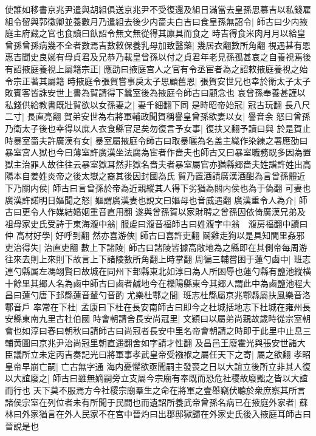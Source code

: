 使誰如移書京兆尹遣與胡組俱送京兆尹不受復還及組日滿當去皇孫思慕吉以私錢雇組令留與郭徵卿並養數月乃遣組去後少内嗇夫白吉曰食皇孫無詔令|{
	師古曰少内掖庭主府藏之官也食讀曰飤詔令無文無從得其廪具而食之}
時吉得食米肉月月以給皇曾孫曾孫病幾不全者數焉吉數敕保養乳母加致醫藥|{
	幾居衣翻數所角翻}
視遇甚有恩惠吉聞史良娣有母貞君及兄恭乃載皇曾孫以付之貞君年老見孫孤甚哀之自養視焉後有詔掖庭養視上屬籍宗正|{
	應劭曰掖庭宫人之官有令丞宦者為之詔敕掖庭養視之始令宗正著其屬籍}
時掖庭令張賀嘗事戾太子思顧舊恩|{
	張賀安世兄也幸於衛太子太子敗賓客皆誅安世上書為賀請得下蠶室後為掖庭令師古曰顧念也}
哀曾孫奉養甚謹以私錢供給教書既壯賀欲以女孫妻之|{
	妻千細翻下同}
是時昭帝始冠|{
	冠古玩翻}
長八尺二寸|{
	長直亮翻}
賀弟安世為右將軍輔政聞賀稱譽皇曾孫欲妻以女|{
	譽音余}
怒曰曾孫乃衛太子後也幸得以庶人衣食縣官足矣勿復言予女事|{
	復扶又翻予讀曰與}
於是賀止時暴室嗇夫許廣漢有女|{
	暴室屬掖庭令師古曰取暴曬為名盖主織作染練之署應劭曰暴室宮人獄也今曰薄室許廣漢坐法腐為宦者作嗇夫也師古又曰暴室職務既多因為置獄主治罪人故往往云暴室獄耳然非獄名嗇夫者暴室屬官亦猶縣郷嗇夫姓譜許姓出高陽本自姜姓炎帝之後太嶽之裔其後因封國為氏}
賀乃置酒請廣漢酒酣為言曾孫體近下乃關内侯|{
	師古曰言曾孫於帝為近親縱其人得下劣猶為關内侯也為于偽翻}
可妻也廣漢許諾明日嫗聞之怒|{
	嫗謂廣漢妻也說文曰嫗母也音威遇翻}
廣漢重令人為介|{
	師古曰更令人作媒結婚姻重音直用翻}
遂與曾孫賀以家財聘之曾孫因依倚廣漢兄弟及祖母家史氏受詩于東海澓中翁|{
	服䖍曰澓音福師古曰姓澓字中翁　澓房福翻中讀曰仲}
高材好學|{
	好呼到翻}
然亦喜游俠|{
	師古曰喜許吏翻}
鬬雞走狗以是具知閭里姦邪吏治得失|{
	治直吏翻}
數上下諸陵|{
	師古曰諸陵皆據高敞地為之縣即在其側帝每周游往來去則上來則下故言上下諸陵數所角翻上時掌翻}
周徧三輔嘗困于蓮勺鹵中|{
	班志連勺縣属左馮翊賢曰故城在同州下邽縣東北如淳曰為人所困辱也蓮勺縣有鹽池縱横十餘里其郷人名為鹵中師古曰鹵者鹹地今在櫟陽縣東今其郷人謂此中為鹵鹽池程大昌曰蓮勺唐下邽縣蓮音輦勺音酌}
尤樂杜鄠之間|{
	班志杜縣屬京兆鄠縣屬扶風樂音洛鄠音戶}
率常在下杜|{
	孟康曰下杜在長安南師古曰即今之杜城括地志下杜城在雍州長安縣東南九里古杜伯國}
時會朝請舍長安尚冠里|{
	文穎曰以屬弟尚親故歲時從宗室朝會也如淳曰春曰朝秋曰請師古曰尚冠者長安中里名帝會朝請之時即于此里中止息三輔黄圖曰京兆尹治尚冠里朝直遥翻舍如字請才性翻}
及昌邑王廢霍光與張安世諸大臣議所立未定丙吉奏記光曰將軍事孝武皇帝受襁褓之屬任天下之寄|{
	屬之欲翻}
孝昭皇帝早崩亡嗣|{
	亡古無字通}
海内憂懼欲亟聞嗣主發喪之日以大誼立後所立非其人復以大誼廢之|{
	師古曰雖無嫡嗣旁立支屬今宗廟有奉既而恐危社稷故廢黜之皆以大誼而行也}
天下莫不服焉方今社稷宗廟羣生之命在將軍之壹舉竊伏聽於衆庶察其所言諸侯宗室在列位者未有所聞于民間也而遺詔所養武帝曾孫名病已在掖庭外家者|{
	蘇林曰外家猶言在外人民家不在宫中晉灼曰出郡邸獄歸在外家史氏後入掖庭耳師古曰晉說是也}
